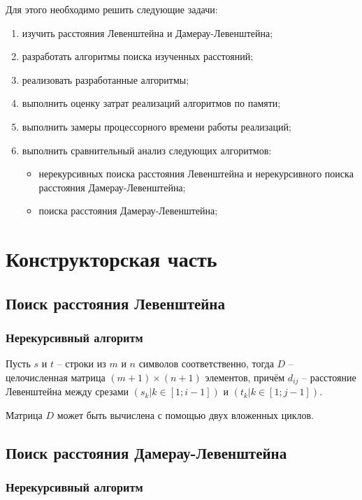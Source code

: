 \documentclass[oneside, a4paper, 12pt]{article}
\begin{document}
Для этого необходимо решить следующие задачи:

\begin{enumerate}
    \item изучить расстояния Левенштейна и Дамерау-Левенштейна;
    \item разработать алгоритмы поиска изученных расстояний;
    \item реализовать разработанные алгоритмы;
    \item выполнить оценку затрат реализаций алгоритмов по памяти;
    \item выполнить замеры процессорного времени работы реализаций;
    \item выполнить сравнительный анализ следующих алгоритмов:
    \begin{itemize}
        \item нерекурсивных поиска расстояния Левенштейна и
            нерекурсивного поиска расстояния Дамерау-Левенштейна;
        \item поиска расстояния Дамерау-Левенштейна;
    \end{itemize}
\end{enumerate}

\section{Конструкторская часть}

\subsection{Поиск расстояния Левенштейна}

\subsubsection{Нерекурсивный алгоритм}

Пусть $s$ и $t$ -- строки из $m$ и $n$ символов соответственно,
тогда $D$ -- целочисленная матрица $(m + 1) \times (n + 1)$
элементов, причём $d_{ij}$ -- расстояние Левенштейна между срезами
$(s_k | k \in [1; i - 1])$ и $(t_k | k \in [1; j - 1])$.

Матрица $D$ может быть вычислена с помощью двух вложенных циклов.

\subsection{Поиск расстояния Дамерау-Левенштейна}

\subsubsection{Нерекурсивный алгоритм}
\end{document}

